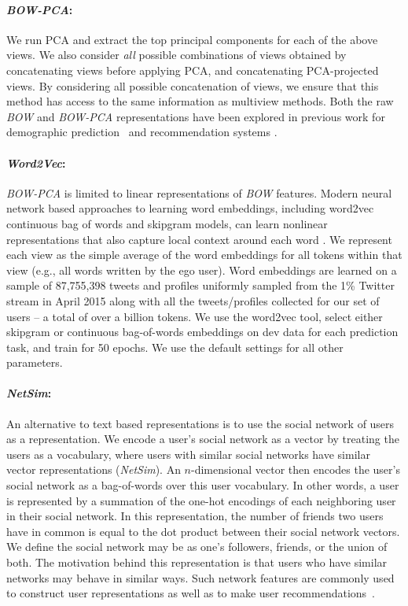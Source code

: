 \documentclass{article}
\newcommand{\bow}{\emph{BOW}} %
\newcommand{\bowpca}{\emph{BOW-PCA}} %
\newcommand{\wordtovec}{\emph{Word2Vec}}
\newcommand{\collab}{\emph{NetSim}} %
\newcommand{\myparagraph}[1]{\vspace{-.2cm}\paragraph{#1}}
\begin{document}
\myparagraph{\bowpca{}:} We run PCA and extract the top principal components for each of the above views.
We also consider \emph{all} possible combinations of views obtained by concatenating views before applying PCA,
and concatenating PCA-projected views.  By considering all possible concatenation of views, we ensure that this
method has access to the same information as multiview methods.
Both the raw \bow{} and \bowpca{} representations have been explored in previous work for demographic prediction~\cite{volkova2014,zamal2012} and recommendation systems \cite{abel2011,zangerle2013}.


\myparagraph{\wordtovec{}:} 

\bowpca{} is limited to linear representations of \bow{} features. Modern neural network based approaches to learning word embeddings, including word2vec continuous bag of words and skipgram models, can learn nonlinear representations that also capture local context around each word \cite{mikolov2013}. 
We represent each view as the simple average of the word embeddings for all tokens within that view (e.g., all words written by the ego user).
Word embeddings are learned on a sample of 87,755,398 tweets and profiles uniformly sampled from the 1\% Twitter stream in April 2015 along
with all the tweets/profiles collected for our set of users -- a total of over a billion tokens. We use the word2vec tool, select either
skipgram or continuous bag-of-words embeddings on dev data for each prediction task, and train for 50 epochs. We use the default settings for all other parameters.

\myparagraph{\collab{}:}  An alternative to text based representations is to use the social network of users as a representation. We encode a user's social network
as a vector by treating the users as a vocabulary, where users with similar social networks have similar vector representations (\collab).  An $n$-dimensional vector then encodes the user's social network as a bag-of-words over this user vocabulary. In other words, a user is represented by a summation of the one-hot encodings of each neighboring user in their social network. In this representation, the number of friends two users have in common is equal to the dot product between their social network vectors. We define the social network may be as one's followers, friends, or the union of both. 
The motivation behind this representation is that users who have similar networks may behave in similar ways. Such network features are commonly used to construct user representations as well as to make user recommendations~\cite{lu2012,kywe2012}. 
\end{document}
